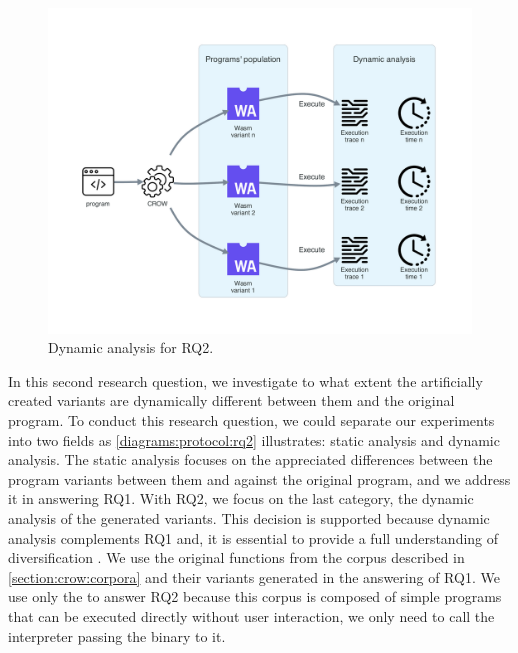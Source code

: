 
\section{\rqtwo}
\label{rq2:method}


\begin{figure}[h]
    \centering
    \includegraphics[width=\linewidth]{diagrams/Rq2.pdf}
    \caption{Dynamic analysis for RQ2.}
    \label{diagrams:protocol:rq2}
\end{figure}

In this second research question, we investigate to what extent the artificially created variants are dynamically different between them and the original program. To conduct this research question, we could separate our experiments into two fields as \autoref{diagrams:protocol:rq2} illustrates: static analysis and dynamic analysis. 
The static analysis focuses on the appreciated differences between the program variants between them and against the original program, and we address it in answering RQ1. 
With RQ2, we focus on the last category, the dynamic analysis of the generated variants. This decision is supported because dynamic analysis complements RQ1 and, it is essential to provide a full understanding of diversification \citationneeded.
We use the original functions from the \corpusrosetta corpus described in \autoref{section:crow:corpora} and their variants generated in the answering of RQ1. 
We use only the \corpusrosetta to answer RQ2 because this corpus is composed of simple programs that can be executed directly without user interaction, \ie we only need to call the interpreter passing the \wasm binary to it. 



